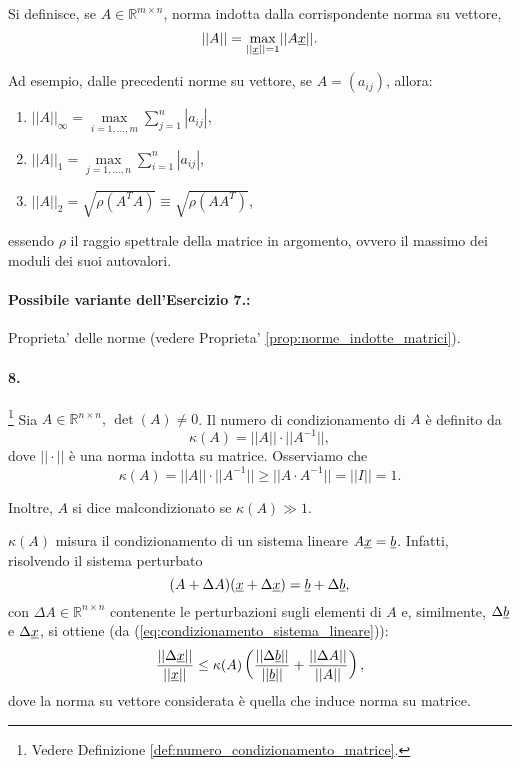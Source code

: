 Si definisce, se $A\in\mathbb{R}^{m\times n}$, norma indotta dalla corrispondente norma su vettore,
\begin{equation*}
	||A|| = \underset{||\uline x|| = 1}{\max}||A \uline x||.
\end{equation*}

Ad esempio, dalle precedenti norme su vettore, se $A=(a_{ij})$, allora:
\begin{enumerate}
	\item $||A||_\infty = \underset{i = 1, \hdots, m}{\max} \sum_{j=1}^{n}|a_{ij}|$,
	\item $||A||_1 = \underset{j = 1,\hdots, n}{\max}\sum_{i = 1}^{n}|a_{ij}|$,
	\item $||A||_2 =\sqrt{\rho(A^T A)} \equiv \sqrt{\rho (AA^T)}$,
\end{enumerate}
essendo $\rho$ il raggio spettrale della matrice in argomento, ovvero il massimo dei moduli dei suoi autovalori.

\paragraph{Possibile variante dell'Esercizio 7.:} Proprieta' delle norme (vedere Proprieta' \ref{prop:norme_indotte_matrici}).

\paragraph{8.}\footnote{Vedere Definizione \ref{def:numero_condizionamento_matrice}.} Sia $A\in\mathbb{R}^{n\times n},\, \det(A) \neq 0$. Il numero di condizionamento di $A$ è definito da
\begin{equation*}
	\kappa(A) = ||A||\cdot||A^{-1}||,
\end{equation*}
dove $||\cdot||$ è una norma indotta su matrice. Osserviamo che
\begin{equation*}
	\kappa(A) = ||A||\cdot||A^{-1}|| \geq ||A\cdot A^{-1}|| = ||I|| = 1.
\end{equation*}

Inoltre, $A$ si dice malcondizionato se $\kappa(A)\gg 1$.

$\kappa(A)$ misura il condizionamento di un sistema lineare $A\uline x = \uline b$. Infatti, risolvendo il sistema perturbato
\begin{equation*}
	(A+\Delta A) (\uline x + \Delta\uline x) = \uline b + \Delta\uline b,
\end{equation*}
con $\Delta A\in\mathbb{R}^{n\times n}$ contenente le perturbazioni sugli elementi di $A$ e, similmente, $\Delta\uline b$ e $\Delta\uline x$, si ottiene (da (\ref{eq:condizionamento_sistema_lineare})):
\begin{equation*}
	 \frac{||\Delta \uline x||}{||\uline x||} \leq \kappa(A)\left(\frac{||\Delta\uline b||}{||\uline b||} + \frac{||\Delta A||}{||A||}\right),
\end{equation*}
dove la norma su vettore considerata è quella che induce norma su matrice.

